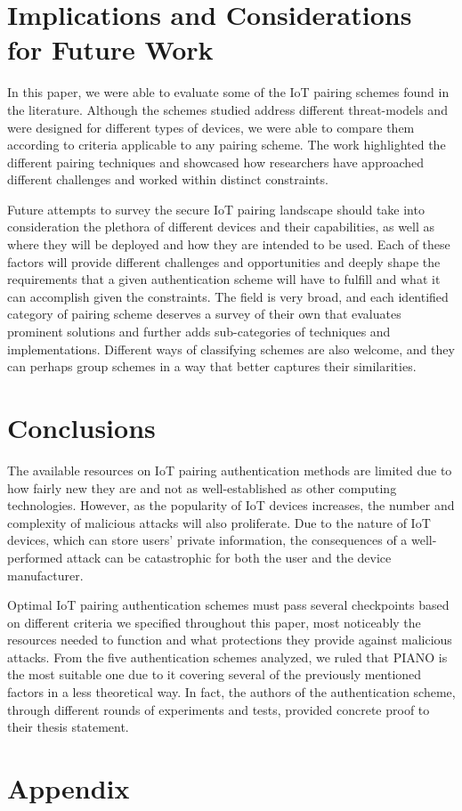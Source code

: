 \documentclass[10pt,twocolumn,letterpaper]{article}
\begin{document}
\section{Implications and Considerations for Future Work}

In this paper, we were able to evaluate some of the IoT pairing schemes found in the literature. Although the schemes studied address different threat-models and were designed for different types of devices, we were able to compare them according to criteria applicable to any pairing scheme. The work highlighted the different pairing techniques and showcased how researchers have approached different challenges and worked within distinct constraints.

Future attempts to survey the secure IoT pairing landscape should take into consideration the plethora of different devices and their capabilities, as well as where they will be deployed and how they are intended to be used. Each of these factors will provide different challenges and opportunities and deeply shape the requirements that a given authentication scheme will have to fulfill and what it can accomplish given the constraints. The field is very broad, and each identified category of pairing scheme deserves a survey of their own that evaluates prominent solutions and further adds sub-categories of techniques and implementations. Different ways of classifying schemes are also welcome, and they can perhaps group schemes in a way that better captures their similarities.

\section{Conclusions}

The available resources on IoT pairing authentication methods are limited due to how fairly new they are and not as well-established as other computing technologies. However, as the popularity of IoT devices increases, the number and complexity of malicious attacks will also proliferate. Due to the nature of IoT devices, which can store users’ private information, the consequences of a well-performed attack can be catastrophic for both the user and the device manufacturer.

Optimal IoT pairing authentication schemes must pass several checkpoints based on different criteria we specified throughout this paper, most noticeably the resources needed to function and what protections they provide against malicious attacks. From the five authentication schemes analyzed, we ruled that PIANO \cite{piano} is the most suitable one due to it covering several of the previously mentioned factors in a less theoretical way. In fact, the authors of the authentication scheme, through different rounds of experiments and tests, provided concrete proof to their thesis statement.

\section{Appendix}
\listoffigures



\end{document}
